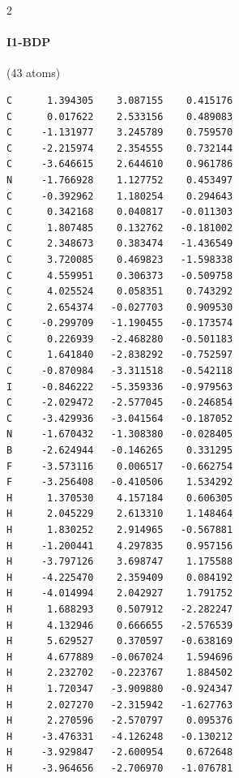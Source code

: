 \begin{multicols}{2}
\paragraph{I1-BDP} (43 atoms)
{\scriptsize\linespread{1}\selectfont\begin{verbatim}
C      1.394305    3.087155    0.415176
C      0.017622    2.533156    0.489083
C     -1.131977    3.245789    0.759570
C     -2.215974    2.354555    0.732144
C     -3.646615    2.644610    0.961786
N     -1.766928    1.127752    0.453497
C     -0.392962    1.180254    0.294643
C      0.342168    0.040817   -0.011303
C      1.807485    0.132762   -0.181002
C      2.348673    0.383474   -1.436549
C      3.720085    0.469823   -1.598338
C      4.559951    0.306373   -0.509758
C      4.025524    0.058351    0.743292
C      2.654374   -0.027703    0.909530
C     -0.299709   -1.190455   -0.173574
C      0.226939   -2.468280   -0.501183
C      1.641840   -2.838292   -0.752597
C     -0.870984   -3.311518   -0.542118
I     -0.846222   -5.359336   -0.979563
C     -2.029472   -2.577045   -0.246854
C     -3.429936   -3.041564   -0.187052
N     -1.670432   -1.308380   -0.028405
B     -2.624944   -0.146265    0.331295
F     -3.573116    0.006517   -0.662754
F     -3.256408   -0.410506    1.534292
H      1.370530    4.157184    0.606305
H      2.045229    2.613310    1.148464
H      1.830252    2.914965   -0.567881
H     -1.200441    4.297835    0.957156
H     -3.797126    3.698747    1.175588
H     -4.225470    2.359409    0.084192
H     -4.014994    2.042927    1.791752
H      1.688293    0.507912   -2.282247
H      4.132946    0.666655   -2.576539
H      5.629527    0.370597   -0.638169
H      4.677889   -0.067024    1.594696
H      2.232702   -0.223767    1.884502
H      1.720347   -3.909880   -0.924347
H      2.027270   -2.315942   -1.627763
H      2.270596   -2.570797    0.095376
H     -3.476331   -4.126248   -0.130212
H     -3.929847   -2.600954    0.672648
H     -3.964656   -2.706970   -1.076781
\end{verbatim}}

\end{multicols}
